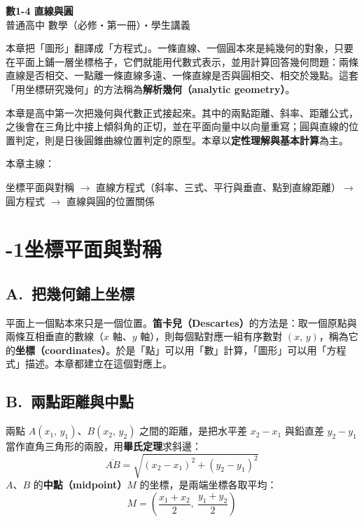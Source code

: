 \documentclass[11pt]{article}
\begin{document}
\begin{center}
{\sffamily\Huge\bfseries 數1-4 直線與圓}\\[3pt]
{\sffamily\large 普通高中 數學（必修・第一冊）・學生講義}
\end{center}
\vspace{0.6em}

本章把「圖形」翻譯成「方程式」。一條直線、一個圓本來是純幾何的對象，只要在平面上鋪一層坐標格子，它們就能用代數式表示，並用計算回答幾何問題：兩條直線是否相交、一點離一條直線多遠、一條直線是否與圓相交、相交於幾點。這套「用坐標研究幾何」的方法稱為\textbf{解析幾何（analytic geometry）}。

本章是高中第一次把幾何與代數正式接起來。其中的兩點距離、斜率、距離公式，之後會在三角比中接上傾斜角的正切，並在平面向量中以向量重寫；圓與直線的位置判定，則是日後圓錐曲線位置判定的原型。本章以\textbf{定性理解與基本計算}為主。

\medskip
本章主線：

\begin{center}
坐標平面與對稱 $\rightarrow$ 直線方程式（斜率、三式、平行與垂直、點到直線距離）$\rightarrow$ 圓方程式 $\rightarrow$ 直線與圓的位置關係
\end{center}

\section*{-1\quad 坐標平面與對稱}

\subsection*{\sffamily A.\ 把幾何鋪上坐標}

平面上一個點本來只是一個位置。\textbf{笛卡兒（Descartes）}的方法是：取一個原點與兩條互相垂直的數線（$x$ 軸、$y$ 軸），則每個點對應一組有序數對 $(x,\,y)$，稱為它的\textbf{坐標（coordinates）}。於是「點」可以用「數」計算，「圖形」可以用「方程式」描述。本章都建立在這個對應上。

\subsection*{\sffamily B.\ 兩點距離與中點}

兩點 $A(x_1,\,y_1)$、$B(x_2,\,y_2)$ 之間的距離，是把水平差 $x_2-x_1$ 與鉛直差 $y_2-y_1$ 當作直角三角形的兩股，用\textbf{畢氏定理}求斜邊：
$$\boxed{\;\overline{AB}=\sqrt{(x_2-x_1)^2+(y_2-y_1)^2}\;}$$
$A$、$B$ 的\textbf{中點（midpoint）}$M$ 的坐標，是兩端坐標各取平均：
$$\boxed{\;M=\left(\frac{x_1+x_2}{2},\ \frac{y_1+y_2}{2}\right)\;}$$
\end{document}
